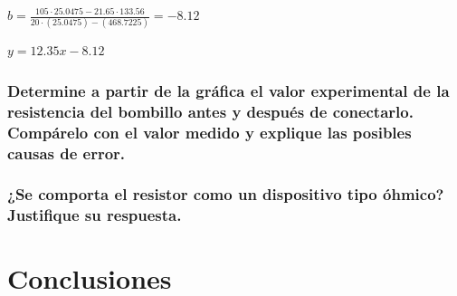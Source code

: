 \documentclass[10pt]{article}
\begin{document}
\begin{multicols}{2}
	$b = \frac{105 \cdot 25.0475 - 21.65 \cdot 133.56}{20 \cdot (25.0475) - (468.7225)} = -8.12$

	$y = 12.35x - 8.12$


	\subsubsection*{Determine a partir de la gráfica el valor experimental de la resistencia del bombillo antes y
		después de conectarlo. Compárelo con el valor medido y explique las posibles causas de error. }

	\subsubsection*{¿Se comporta el resistor como un dispositivo tipo óhmico? Justifique su respuesta. }







\end{multicols}

\newpage

\section{Conclusiones}

\newpage


\end{document}
